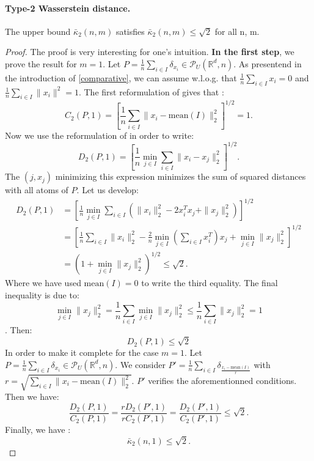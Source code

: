 \documentclass{amsart}
\newcommand{\RR}{\mathbb{R}}
\begin{document}
\paragraph{\textbf{Type-2 Wasserstein distance.}}
\begin{proposition}
    The upper bound $\bar\kappa_2\left(n,m\right)$ satisfies $\bar\kappa_2\left(n,m\right)\leq \sqrt{2}$ for all n, m.
\end{proposition}
\begin{proof} 
    The proof is very interesting for one's intuition. \textbf{In the first step}, we prove the result for $m=1$. Let $P=\frac{1}{n}\sum_{i\in I}\delta_{x_i}\in\mathcal{P}_U\left(\RR^d,n\right)$. As presentend in the introduction of \ref{comparative}, we can assume w.l.o.g. that $\frac{1}{n}\sum_{i\in I}x_i=0$ and $\frac{1}{n}\sum_{i\in I}\lVert x_i\rVert^2=1$.
    \newline
    The first reformulation of  gives that :
    $$
    C_2\left(P,1\right)=\left[\frac{1}{n}\sum_{i\in I}\lVert x_i-\text{mean}(I)\rVert_2^2\right]^{1/2}=1.
    $$
    Now we use the reformulation of  in order to write:
    $$
    D_2\left(P,1\right)=\left[\frac{1}{n}\min_{j\in I}\sum_{i\in I}\lVert x_i-x_j\rVert^2_2\right]^{1/2}.
    $$
    The $\left(j, x_j\right)$ minimizing this expression minimizes the sum of squared distances with all atoms of $P$. Let us develop:
    \begin{align*}
    D_2\left(P,1\right)&=\left[\frac{1}{n}\min_{j\in I}\sum_{i\in I}\left(\rVert x_i\rVert^2_2-2x_i^Tx_j+\rVert x_j\rVert^2_2\right)\right]^{1/2}\\&=\left[\frac{1}{n}\sum_{i\in I}\lVert x_i\rVert_2^2-\frac{2}{n}\min_{j\in I}\left(\sum_{i\in I}x_i^T\right)x_j+\min_{j\in I}\lVert x_j\rVert^2_2\right]^{1/2} \\&=\left(1+\min_{j\in I}\lVert x_j\rVert^2_2\right)^{1/2}\leq\sqrt{2}.
    \end{align*}
Where we have used $\text{mean}(I)=0$ to write the third equality. The final inequality is due to: $$\min_{j\in I}\lVert x_j\rVert^2_2=\frac{1}{n}\sum_{i\in I}\min_{j\in I}\lVert x_j\rVert^2_2\leq \frac{1}{n}\sum_{i\in I}\lVert x_j\rVert^2_2=1$$. Then: $$D_2\left(P,1\right)\leq\sqrt{2}$$
In order to make it complete for the case $m=1$. Let $P=\frac{1}{n}\sum_{i\in I}\delta_{x_i}\in\mathcal{P}_U\left(\RR^d,n\right)$. We consider $P'=\frac{1}{n}\sum_{i\in I}\delta_{\frac{x_i-\text{mean}(I)}{r}}$ with $r=\sqrt{\sum_{i\in I}\rVert x_i-\text{mean}(I)\lVert^2_2}$. $P'$ verifies the aforementionned conditions. Then we have: 
$$
\frac{D_2\left(P,1\right)}{C_2\left(P,1\right)}=\frac{rD_2\left(P',1\right)}{rC_2\left(P',1\right)}=\frac{D_2\left(P',1\right)}{C_2\left(P',1\right)}\leq \sqrt{2}.
$$
Finally, we have : $$\bar\kappa_2\left(n,1\right)\leq\sqrt{2}.$$
\newline


\end{proof}
\end{document}

